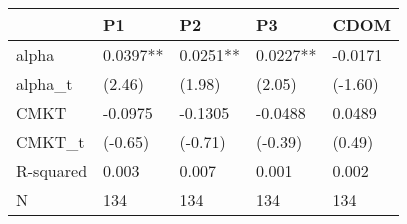 \begin{tabular}{lllll}
\toprule
 & P1 & P2 & P3 & CDOM \\
\midrule
alpha & 0.0397** & 0.0251** & 0.0227** & -0.0171 \\
alpha_t & (2.46) & (1.98) & (2.05) & (-1.60) \\
CMKT & -0.0975 & -0.1305 & -0.0488 & 0.0489 \\
CMKT_t & (-0.65) & (-0.71) & (-0.39) & (0.49) \\
R-squared & 0.003 & 0.007 & 0.001 & 0.002 \\
N & 134 & 134 & 134 & 134 \\
\bottomrule
\end{tabular}
